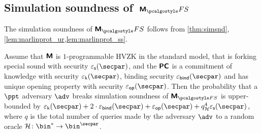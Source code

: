 \subsection{Simulation soundness of~$\marlinprotfs$}
	The simulation soundness of $\marlinprot_\fs$ follows from \cref{thm:simsnd}, \cref{lem:marlinprot_ur,lem:marlinprot_ss}.
\begin{corollary}
	\label{cor:simsnd-M}
	Assume that $\bm{\mathsf{M}}$ is $1$-programmable HVZK in the standard model, that
	is forking special sound with security $\epss(\secpar)$, and the $\bm{\mathsf{PC}}$ is a commitment of knowledge with
	security $\epsk(\secpar)$, binding security $\epsbind(\secpar)$ and has unique
	opening property with security $\epsop(\secpar)$. Then the probability that a
	$\ppt$ adversary $\adv$ breaks simulation soundness of $\marlinprot_{\fs}$ is
	upper-bounded by
	\( \epsk(\secpar) + 2\cdot\epsbind(\secpar) + \epsop(\secpar) + q_\ro^4
	\epss(\secpar)\,, \) where $q$ is the total number of queries made by the
	adversary $\adv$ to a random oracle $\ro\colon \bin^{*} \to \bin^{\secpar}$.
\end{corollary}


